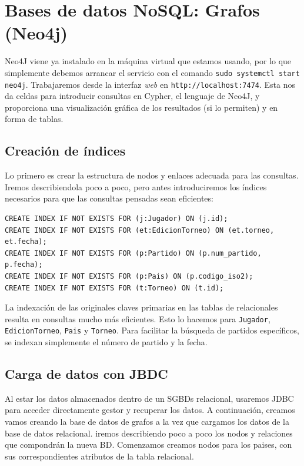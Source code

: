 \section{Bases de datos NoSQL: Grafos (Neo4j)}

Neo4J viene ya instalado en la máquina virtual que estamos usando, por lo que simplemente debemos arrancar el servicio con el comando \texttt{sudo systemctl start neo4j}. Trabajaremos desde la interfaz \textit{web} en \texttt{http://localhost:7474}. Esta nos da celdas para introducir consultas en Cypher, el lenguaje de Neo4J, y proporciona una visualización gráfica de los resultados (si lo permiten) y en forma de tablas. \\

\subsection{Creación de índices}

Lo primero es crear la estructura de nodos y enlaces adecuada para las consultas. Iremos describiendola poco a poco, pero antes introduciremos los índices necesarios para que las consultas pensadas sean eficientes:

\begin{verbatim}
CREATE INDEX IF NOT EXISTS FOR (j:Jugador) ON (j.id);
CREATE INDEX IF NOT EXISTS FOR (et:EdicionTorneo) ON (et.torneo, et.fecha);
CREATE INDEX IF NOT EXISTS FOR (p:Partido) ON (p.num_partido, p.fecha);
CREATE INDEX IF NOT EXISTS FOR (p:Pais) ON (p.codigo_iso2);
CREATE INDEX IF NOT EXISTS FOR (t:Torneo) ON (t.id);
\end{verbatim}

La indexación de las originales claves primarias en las tablas de relacionales resulta en consultas mucho más eficientes. Esto lo hacemos para \texttt{Jugador}, \texttt{EdicionTorneo}, \texttt{Pais} y \texttt{Torneo}. Para facilitar la búsqueda de partidos específicos, se indexan simplemente el número de partido y la fecha.

\subsection{Carga de datos con JBDC}

Al estar los datos almacenados dentro de un SGBDs relacional, usaremos JDBC para acceder directamente gestor y recuperar los datos. A continuación, creamos vamos creando la base de datos de grafos a la vez que cargamos los datos de la base de datos relacional. iremos describiendo poco a poco los nodos y relaciones que compondrán la nueva BD. Comenzamos creamos nodos para los paises, con sus correspondientes atributos de la tabla relacional. 

